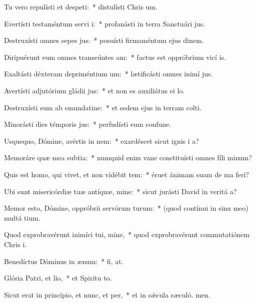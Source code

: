 \item Tu vero repulísti et despeti:~* distulísti Chris um.
\item Evertísti testaméntum servi i:~* profanásti in terra Sanctuári jus.
\item Destruxísti omnes sepes jus:~* posuísti firmaméntum ejus dinem.
\item Diripuérunt eum omnes transeúntes am:~* factus est oppróbrium vicí is.
\item Exaltásti déxteram depriméntium um:~* lætificásti omnes inimí jus.
\item Avertísti adjutórium gládii jus:~* et non es auxiliátus ei  lo.
\item Destruxísti eum ab emundatine:~* et sedem ejus in terram colti.
\item Minorásti dies témporis jus:~* perfudísti eum confune.
\item Usquequo, Dómine, avértis in nem:~* exardéscet sicut ignis i a?
\item Memoráre quæ mea subtia:~* numquid enim vane constituísti omnes fíli minum?
\item Quis est homo, qui vivet, et non vidébit tem:~* éruet ánimam suam de ma feri?
\item Ubi sunt misericórdiæ tuæ antíquæ, mine:~* sicut jurásti David in veritá a?
\item Memor esto, Dómine, oppróbrii servórum turum:~* (quod contínui in sinu meo) multá tium.
\item Quod exprobravérunt inimíci tui, mine,~* quod exprobravérunt commutatiónem Chris i.
\item Benedíctus Dóminus in ænum:~* fi, at.
\item Glória Patri, et lio,~* et Spirítu to.
\item Sicut erat in princípio, et nunc, et per,~* et in sǽcula sæculó. men.
